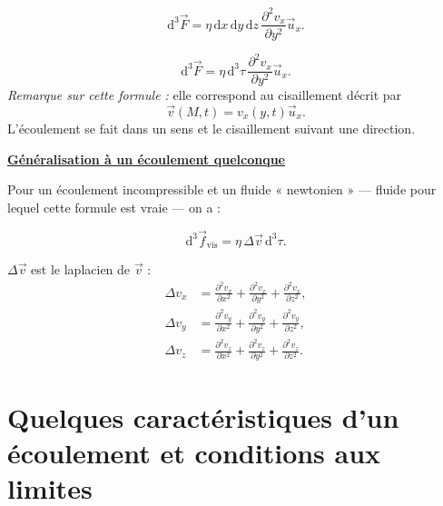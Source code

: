 \documentclass[11pt,a4paper]{article}
\newcommand{\dd}{\mathrm d}
\newcommand{\vv}{\vec v}
\newcommand{\ux}{\vec u_x}\newcommand{\uy}{\vec u_y}\newcommand{\uz}{\vec u_z}
\newcommand{\titr}[1]{\par\needspace{4\baselineskip}\textbf{\underline{#1}}\par}
\begin{document}
\[\dd^3\vec F=\eta\,\dd x\,\dd y\,\dd z\,\frac{\partial^2v_x}{\partial y^2}\ux.\]
\begin{cadre}\[\dd^3\vec F=\eta\,\dd^3\tau\,\frac{\partial^2v_x}{\partial y^2}\ux.\]
\textit{Remarque sur cette formule :} elle correspond au cisaillement décrit par
\[\vv(M,t)=v_x(y,t)\ux.\]
L'écoulement se fait dans un sens et le cisaillement suivant une direction.
\end{cadre}
\titr{Généralisation à un écoulement quelconque}
Pour un écoulement incompressible et un fluide « newtonien » --- fluide pour lequel cette formule est vraie --- on a :
\begin{cadre}[etoiles={\mathord{\star}\,\mathord{\star}\,\mathord{\star}\,\mathord{\star}\,\mathord{\star}}]\[\dd^3\vec f_{\mathrm{vis}}=\eta\,\Delta\vv\,\dd^3\tau.\]\end{cadre}
$\Delta\vv$ est le laplacien de $\vv$ :
\[\begin{aligned}
\Delta v_x&=\frac{\partial^2v_x}{\partial x^2}+\frac{\partial^2v_x}{\partial y^2}+\frac{\partial^2v_x}{\partial z^2},\\[6pt]
\Delta v_y&=\frac{\partial^2v_y}{\partial x^2}+\frac{\partial^2v_y}{\partial y^2}+\frac{\partial^2v_y}{\partial z^2},\\[6pt]
\Delta v_z&=\frac{\partial^2v_z}{\partial x^2}+\frac{\partial^2v_z}{\partial y^2}+\frac{\partial^2v_z}{\partial z^2}.
\end{aligned}\]
\setcounter{section}{2}
\section{Quelques caractéristiques d'un écoulement et conditions aux limites}
\end{document}
